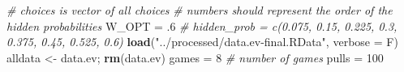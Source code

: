 \documentclass[11pt,,]{article}
\newenvironment{Shaded}{\begin{snugshade}}{\end{snugshade}}
\newcommand{\KeywordTok}[1]{\textcolor[rgb]{0.13,0.29,0.53}{\textbf{{#1}}}}
\newcommand{\DataTypeTok}[1]{\textcolor[rgb]{0.13,0.29,0.53}{{#1}}}
\newcommand{\DecValTok}[1]{\textcolor[rgb]{0.00,0.00,0.81}{{#1}}}
\newcommand{\StringTok}[1]{\textcolor[rgb]{0.31,0.60,0.02}{{#1}}}
\newcommand{\CommentTok}[1]{\textcolor[rgb]{0.56,0.35,0.01}{\textit{{#1}}}}
\newcommand{\NormalTok}[1]{{#1}}
\begin{document}
\begin{Shaded}
\begin{Highlighting}[]
\CommentTok{# choices is vector of all choices}
\CommentTok{# numbers should represent the order of the hidden probabilities}
\NormalTok{W_OPT =}\StringTok{ }\NormalTok{.}\DecValTok{6}
\CommentTok{# hidden_prob = c(0.075, 0.15, 0.225, 0.3, 0.375, 0.45, 0.525, 0.6)}
\KeywordTok{load}\NormalTok{(}\StringTok{"../processed/data.ev-final.RData"}\NormalTok{, }\DataTypeTok{verbose =} \NormalTok{F)}
\NormalTok{alldata <-}\StringTok{ }\NormalTok{data.ev; }\KeywordTok{rm}\NormalTok{(data.ev)}
\NormalTok{games =}\StringTok{ }\DecValTok{8} \CommentTok{# number of games}
\NormalTok{pulls =}\StringTok{ }\DecValTok{100}
\end{Highlighting}
\end{Shaded}
\end{document}
